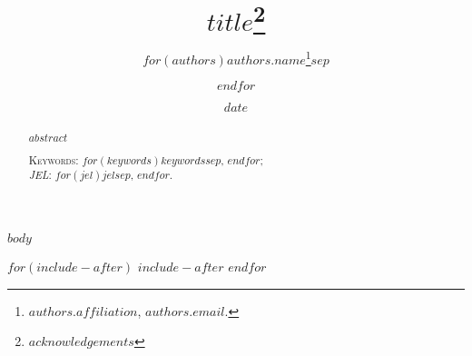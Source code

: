 \documentclass[a4paper, 1]{article}
\date{$date$}
\title{\LARGE{$title$}\thanks{$acknowledgements$}}
\author{\onehalfspacing
  $for(authors)$$authors.name$\thanks{$authors.affiliation$, $authors.email$.}$sep$ \and $endfor$
}
\begin{document}
\maketitle

\begin{abstract}
\noindent $abstract$

\vspace{1cm}
\noindent\textsc{Keywords}: $for(keywords)$$keywords$$sep$, $endfor$;\\
\textit{JEL}: $for(jel)$$jel$$sep$, $endfor$.
\end{abstract}

\clearpage
{}

$body$

$for(include-after)$
$include-after$
$endfor$
\end{document}
